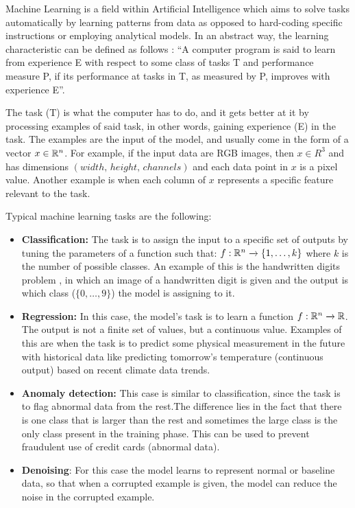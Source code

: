 Machine Learning is a field within Artificial Intelligence which aims to solve tasks automatically by learning patterns from data as opposed to hard-coding specific instructions or employing analytical models. In an abstract way, the learning characteristic can be defined as follows \cite{Mitchell}: “A computer program is said to learn from experience E with respect to some class of tasks T and performance measure P, if its performance at tasks in T, as measured by P, improves with experience E”.

 The task (T) is what the computer has to do, and it gets better at it by processing examples of said task, in other words, gaining experience (E) in the task. The examples are the input of the model, and usually come in the form of a vector $x \in \mathbb{R}^n$. For example, if the input data are RGB images, then $x \in R^3$ and has dimensions $(width,\hspace{2pt} height, \hspace{2pt} channels)$ and each data point in $x$ is a pixel value. Another example is when each column of $x$ represents a specific feature relevant to the task.

Typical machine learning tasks are the following:
\begin{itemize}
    \item \textbf{Classification:} The task is to assign the input to a specific set of outputs by tuning the parameters of a function such that: $f: \mathbb{R}^n \xrightarrow{} \{1,\ldots, k\}$ where $k$ is the number of possible classes. An example of this is the handwritten digits problem \cite{MNIST}, in which an image of a handwritten digit is given and the output is which class ($\{0,\ldots,9\}$) the model is assigning to it. 
    \item \textbf{Regression:} In this case, the model's task is to learn a function $f: \mathbb{R}^n\xrightarrow{}\mathbb{R}$. The output is not a finite set of values, but a continuous value. Examples of this are when the task is to predict some physical measurement in the future with historical data like predicting tomorrow's temperature (continuous output) based on recent climate data trends.
    \item \textbf{Anomaly detection:} This case is similar to classification, since the task is to flag abnormal data from the rest.The difference lies in the fact that there is one class that is larger than the rest and sometimes the large class is the only class present in the training phase. This can be used to prevent fraudulent use of credit cards (abnormal data). 
    \item \textbf{Denoising}: For this case the model learns to represent normal or baseline data, so that when a corrupted example is given, the model can reduce the noise in the corrupted example.
\end{itemize}

